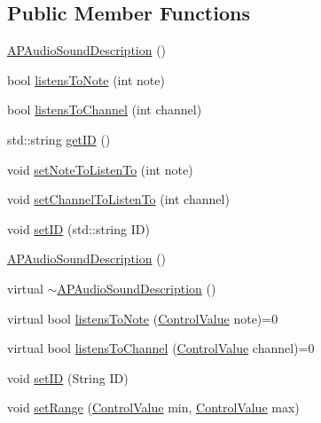 \subsection*{Public Member Functions}
\begin{DoxyCompactItemize}
\item 
\hyperlink{class_a_p_audio_sound_description_a76cf64adbccf5889ed68d85d55ee84c2}{A\+P\+Audio\+Sound\+Description} ()
\item 
bool \hyperlink{class_a_p_audio_sound_description_ae70d06dfd589349677637944eb5c5749}{listens\+To\+Note} (int note)
\item 
bool \hyperlink{class_a_p_audio_sound_description_a3b885791067a1c7a395d8e4bf94cfba5}{listens\+To\+Channel} (int channel)
\item 
std\+::string \hyperlink{class_a_p_audio_sound_description_af619f3b304e36dbce36d40368daac12c}{get\+I\+D} ()
\item 
void \hyperlink{class_a_p_audio_sound_description_a4bb63a0cddd57b4351a8c81d29c9c425}{set\+Note\+To\+Listen\+To} (int note)
\item 
void \hyperlink{class_a_p_audio_sound_description_a410e761e9eeb1fb3ba8f4a8eb2435c48}{set\+Channel\+To\+Listen\+To} (int channel)
\item 
void \hyperlink{class_a_p_audio_sound_description_aecc9f38d3b4f0c459a7d230385afe281}{set\+I\+D} (std\+::string I\+D)
\item 
\hyperlink{class_a_p_audio_sound_description_a76cf64adbccf5889ed68d85d55ee84c2}{A\+P\+Audio\+Sound\+Description} ()
\item 
virtual \hyperlink{class_a_p_audio_sound_description_ab9e7c944d289ef31f6d71b246254bd95}{$\sim$\+A\+P\+Audio\+Sound\+Description} ()
\item 
virtual bool \hyperlink{class_a_p_audio_sound_description_af0e31cf64b1726fb97c9d027d2bc4c74}{listens\+To\+Note} (\hyperlink{_a_p_audio_module_8h_a9219378a2632ccf0389d00317ce8cdc4}{Control\+Value} note)=0
\item 
virtual bool \hyperlink{class_a_p_audio_sound_description_aa4ab161259b35de895c07eb718629b98}{listens\+To\+Channel} (\hyperlink{_a_p_audio_module_8h_a9219378a2632ccf0389d00317ce8cdc4}{Control\+Value} channel)=0
\item 
void \hyperlink{class_a_p_audio_sound_description_a3f6a4f1c923ef861586637429c87331d}{set\+I\+D} (String I\+D)
\item 
void \hyperlink{class_a_p_audio_sound_description_a07442fa084810f983751c383f7813c09}{set\+Range} (\hyperlink{_a_p_audio_module_8h_a9219378a2632ccf0389d00317ce8cdc4}{Control\+Value} min, \hyperlink{_a_p_audio_module_8h_a9219378a2632ccf0389d00317ce8cdc4}{Control\+Value} max)

\end{DoxyCompactItemize}

